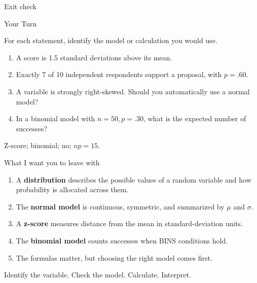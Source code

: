 \documentclass[11pt,aspectratio=169]{beamer}
\newcommand{\yourturn}[1]{%
\begin{center}
\begin{minipage}{0.90\textwidth}
\begin{alertblock}{Your Turn}
#1
\end{alertblock}
\end{minipage}
\end{center}}
\begin{document}
\begin{frame}{Exit check}
\yourturn{
For each statement, identify the model or calculation you would use.
\begin{enumerate}
  \item A score is 1.5 standard deviations above its mean.
  \item Exactly 7 of 10 independent respondents support a proposal, with $p=.60$.
  \item A variable is strongly right-skewed. Should you automatically use a normal model?
  \item In a binomial model with $n=50,p=.30$, what is the expected number of successes?
\end{enumerate}}

\pause
\vfill
\begin{center}
Z-score; binomial; no; $np=15$.
\end{center}
\end{frame}

\begin{frame}{What I want you to leave with}
\begin{enumerate}
  \item A \textbf{distribution} describes the possible values of a random variable and how probability is allocated across them.
  \item The \textbf{normal model} is continuous, symmetric, and summarized by $\mu$ and $\sigma$.
  \item A \textbf{z-score} measures distance from the mean in standard-deviation units.
  \item The \textbf{binomial model} counts successes when BINS conditions hold.
  \item The formulas matter, but choosing the right model comes first.
\end{enumerate}

\vfill
\begin{center}
\Large \alert{Identify the variable. Check the model. Calculate. Interpret.}
\end{center}
\end{frame}
\end{document}
